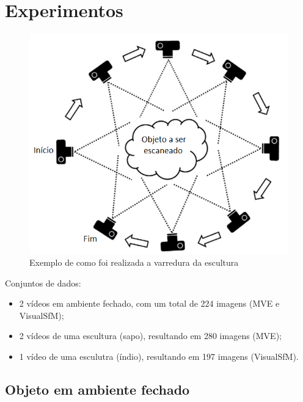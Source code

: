 \documentclass[table, usenames, svgnames, xcolor=dvipsnames]{beamer}
\begin{document}
\section{Experimentos}

\begin{frame}
	\begin{figure}
		\centering
		\includegraphics[width=0.7\linewidth]{figs/procedimentoscan.png}
		\caption{%
		Exemplo de como foi realizada a varredura da escultura
		}
	\end{figure}
\end{frame}

\begin{frame}
	Conjuntos de dados:
	\begin{center}
		\begin{itemize}
			\item 2 vídeos em ambiente fechado, com um total de 224 imagens (MVE e VisualSfM);
			\item 2 vídeos de uma escultura (sapo), resultando em 280 imagens (MVE);
			\item 1 vídeo de uma esculutra (índio), resultando em 197 imagens (VisualSfM).
		\end{itemize}
	\end{center}
\end{frame}



\subsection{Objeto em ambiente fechado}
\end{document}

